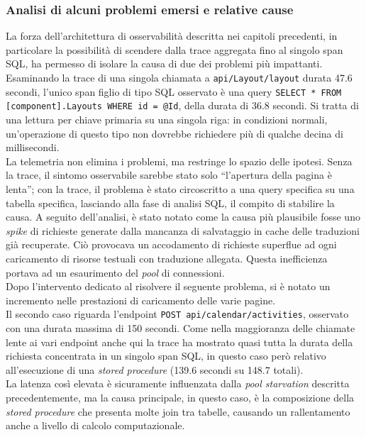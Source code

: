 \subsubsection{Analisi di alcuni problemi emersi e relative cause}

La forza dell'architettura di osservabilità descritta nei capitoli precedenti,
in particolare la possibilità di scendere dalla trace aggregata fino al singolo
span SQL, ha permesso di isolare la causa di due dei problemi più impattanti.\\
Esaminando la trace di una singola chiamata a \texttt{api/Layout/layout} durata
47.6 secondi, l'unico span figlio di tipo SQL osservato è una query
\texttt{SELECT * FROM [component].Layouts WHERE id = @Id}, della durata di 36.8
secondi. Si tratta di una lettura per chiave primaria su una singola riga: in
condizioni normali, un'operazione di questo tipo non dovrebbe richiedere più di
qualche decina di millisecondi.\\
La telemetria non elimina i problemi, ma
restringe lo spazio delle ipotesi. Senza la trace, il sintomo osservabile
sarebbe stato solo ``l'apertura della pagina è lenta''; con la trace, il
problema è stato circoscritto a una query specifica su una tabella specifica,
lasciando alla fase di analisi SQL, il compito di stabilire la causa.
A seguito dell'analisi, è stato notato come la causa più plausibile fosse uno
\emph{spike} di richieste generate dalla mancanza di salvataggio in cache delle traduzioni
già recuperate. Ciò provocava un accodamento di richieste superflue ad ogni caricamento di
risorse testuali con traduzione allegata.
Questa inefficienza portava ad un esaurimento del \emph{pool} di connessioni.\\
Dopo l'intervento dedicato al risolvere il seguente problema, si è notato un
incremento nelle prestazioni di caricamento delle varie pagine.\\
Il secondo caso riguarda l'endpoint \texttt{POST api/calendar/activities},
osservato con una durata massima di 150 secondi. Come nella maggioranza delle
chiamate lente ai vari endpoint anche qui la trace ha mostrato quasi tutta la durata della
richiesta concentrata in un singolo span SQL, in questo caso però relativo all'esecuzione di una
\emph{stored procedure} (139.6 secondi su 148.7 totali).\\
La latenza così elevata è sicuramente influenzata dalla \emph{pool starvation} descritta
precedentemente, ma la causa principale, in questo caso, è la composizione della
\emph{stored procedure} che presenta molte join tra tabelle, causando un rallentamento
anche a livello di calcolo computazionale.

